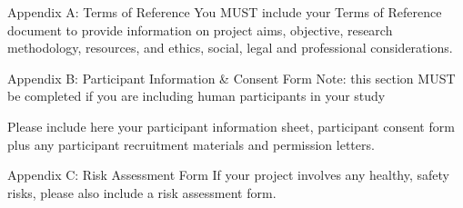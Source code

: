 \documentclass[../CHEFCookingHelperForEveryonesFridge.tex]{subfiles}
\begin{document}
Appendix A: Terms of Reference
You MUST include your Terms of Reference document to provide information on project aims, objective, research methodology, resources, and ethics, social, legal and professional considerations.


Appendix B: Participant Information \& Consent Form
Note: this section MUST be completed if you are including human participants in your study

Please include here your participant information sheet, participant consent form plus any participant recruitment materials and permission letters.

Appendix C: Risk Assessment Form
If your project involves any healthy, safety risks, please also include a risk assessment form.

\ifSubfilesClassLoaded{
    \todos
}{}
\end{document}
